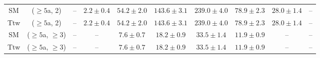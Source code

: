 \begin{table}[h!]
{\begin{tabular}{cccccccccc}
	SM & ($\ge5$a, 2) & -- & $2.2\pm 0.4$ & $54.2\pm 2.0$ & $143.6\pm 3.1$ & $239.0\pm 4.0$ & $78.9\pm 2.3$ & $28.0\pm 1.4$ & -- \\[0.5ex] 
	Ttw & ($\ge5$a, 2) & -- & $2.2\pm 0.4$ & $54.2\pm 2.0$ & $143.6\pm 3.1$ & $239.0\pm 4.0$ & $78.9\pm 2.3$ & $28.0\pm 1.4$ & -- \\[0.5ex] 
	SM & ($\ge5$a, $\ge3$) & -- & -- & $7.6\pm 0.7$ & $18.2\pm 0.9$ & $33.5\pm 1.4$ & $11.9\pm 0.9$ & -- & -- \\[0.5ex] 
	Ttw & ($\ge5$a, $\ge3$) & -- & -- & $7.6\pm 0.7$ & $18.2\pm 0.9$ & $33.5\pm 1.4$ & $11.9\pm 0.9$ & -- & -- \\[0.5ex] 
	\hline
	\hline
\end{tabular}}
\end{table}
